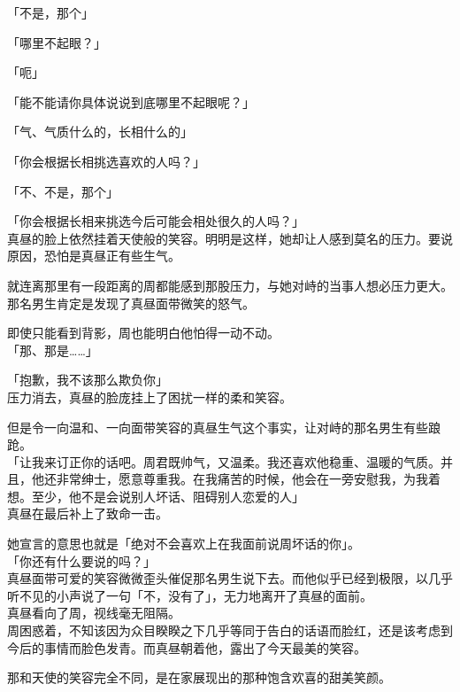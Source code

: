 「不是，那个」

「哪里不起眼？」

「呃」

「能不能请你具体说说到底哪里不起眼呢？」

「气、气质什么的，长相什么的」

「你会根据长相挑选喜欢的人吗？」

「不、不是，那个」

「你会根据长相来挑选今后可能会相处很久的人吗？」\\

真昼的脸上依然挂着天使般的笑容。明明是这样，她却让人感到莫名的压力。要说原因，恐怕是真昼正有些生气。

就连离那里有一段距离的周都能感到那股压力，与她对峙的当事人想必压力更大。\\

那名男生肯定是发现了真昼面带微笑的怒气。

即使只能看到背影，周也能明白他怕得一动不动。\\

「那、那是……」

「抱歉，我不该那么欺负你」\\

压力消去，真昼的脸庞挂上了困扰一样的柔和笑容。

但是令一向温和、一向面带笑容的真昼生气这个事实，让对峙的那名男生有些踉跄。\\

「让我来订正你的话吧。周君既帅气，又温柔。我还喜欢他稳重、温暖的气质。并且，他还非常绅士，愿意尊重我。在我痛苦的时候，他会在一旁安慰我，为我着想。至少，他不是会说别人坏话、阻碍别人恋爱的人」\\

真昼在最后补上了致命一击。

她宣言的意思也就是「绝对不会喜欢上在我面前说周坏话的你」。\\

「你还有什么要说的吗？」\\

真昼面带可爱的笑容微微歪头催促那名男生说下去。而他似乎已经到极限，以几乎听不见的小声说了一句「不，没有了」，无力地离开了真昼的面前。\\

真昼看向了周，视线毫无阻隔。\\

周困惑着，不知该因为众目睽睽之下几乎等同于告白的话语而脸红，还是该考虑到今后的事情而脸色发青。而真昼朝着他，露出了今天最美的笑容。

那和天使的笑容完全不同，是在家展现出的那种饱含欢喜的甜美笑颜。\\

